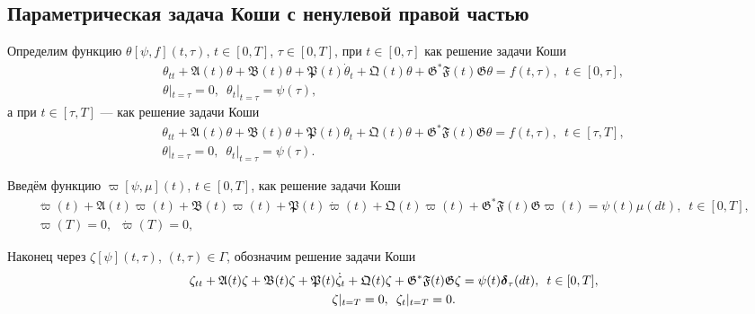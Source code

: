 \documentclass{report}
\newcommand{\mydelta}{\text{\mathversion{bold}$\delta$\mathversion{normal}}}
\begin{document}
	    \subsection{Параметрическая задача Коши с ненулевой правой частью}
Определим функцию $\theta[\psi,f](t,\tau)$, $t\in[0,T]$, $\tau\in[0,T]$, при $t\in[0,\tau]$ как решение задачи Коши
\begin{gather}\label{abstrChauchyprobeq:nonaut:parametric:non-homogenious.eq!t.less.than.tau}
\theta_{tt}+\mathfrak{A}(t)\theta+\mathfrak{B}(t)\theta + \mathfrak{P}(t)\dot{\theta}_t + \mathfrak{Q}(t)\theta + \mathfrak{G}^*\mathfrak{F}(t)\mathfrak{G}\theta = f(t,\tau),\,\,\,t\in[0,\tau],\\
\label{abstrChauchyprobinitcond:nonaut:parametric:non-homogenious.eq!t.less.than.tau}
\theta|_{t=\tau}=0,\,\,\,\theta_t|_{t=\tau}=\psi(\tau),
\end{gather}
а при $t\in[\tau,T]$ --- как решение задачи Коши
\begin{gather}\label{abstrChauchyprobeq:nonaut:parametric:non-homogenious.eq!t.greater.than.tau}
\theta_{tt}+\mathfrak{A}(t)\theta+\mathfrak{B}(t)\theta + \mathfrak{P}(t){\theta}_t + \mathfrak{Q}(t)\theta + \mathfrak{G}^*\mathfrak{F}(t)\mathfrak{G}\theta = f(t,\tau),\,\,\,t\in[\tau,T],\\
\label{abstrChauchyprobinitcond:nonaut:parametric:non-homogenious.eq!t.greater.than.tau}
\theta|_{t=\tau}=0,\,\,\,\theta_t|_{t=\tau}=\psi(\tau).
\end{gather}

Введём функцию $\varpi[\psi,\mu](t)$, $t\in[0,T]$, как решение задачи Коши
\begin{gather}\label{abstrChauchyprobeq:nonaut:Radon:varpi}
\ddot{\varpi}(t)+\mathfrak{A}(t){\varpi}(t)+\mathfrak{B}(t){\varpi}(t) + \mathfrak{P}(t)\dot{\varpi}(t) + \mathfrak{Q}(t){\varpi}(t) + \mathfrak{G}^*\mathfrak{F}(t)\mathfrak{G}{\varpi}(t) = \psi(t)\mu(dt),\,\,\,t\in[0,T],\\
\label{abstrChauchyprobinitcond:nonaut:Radon:varpi}
{\varpi}(T)=0,\,\,\,\dot{\varpi}(T)=0,
\end{gather}

Наконец через $\zeta[\psi](t,\tau)$, $(t,\tau)\in\Gamma$, обозначим решение задачи Коши
\begin{gather}\label{abstrChauchyprobeq:nonaut:parametric:non-homogenious.zeta}
\zeta_{tt}+\mathfrak{A}(t)\zeta+\mathfrak{B}(t)\zeta + \mathfrak{P}(t)\dot{\zeta}_t + \mathfrak{Q}(t)\zeta + \mathfrak{G}^*\mathfrak{F}(t)\mathfrak{G}\zeta = \psi(t)\mydelta_\tau(dt),\,\,\,t\in[0,T],\\
\label{abstrChauchyprobinitcond:nonaut:parametric:non-homogenious.zeta}
\zeta|_{t=T}=0,\,\,\,\zeta_t|_{t=T}=0.
\end{gather}
\end{document}

